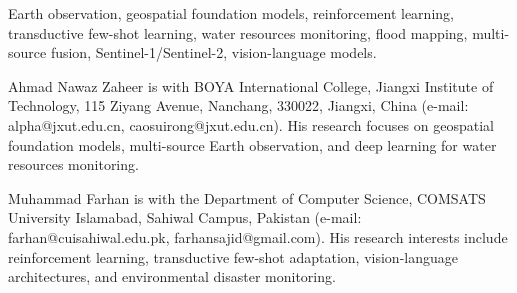 \documentclass[journal]{IEEEtran}
\begin{document}
\begin{IEEEkeywords}
Earth observation, geospatial foundation models, reinforcement learning, transductive few-shot learning, water resources monitoring, flood mapping, multi-source fusion, Sentinel-1/Sentinel-2, vision-language models.
\end{IEEEkeywords}














\begin{IEEEbiographynophoto}{Ahmad Nawaz Zaheer}
is with BOYA International College, Jiangxi Institute of Technology, 115 Ziyang Avenue, Nanchang, 330022, Jiangxi, China (e-mail: alpha@jxut.edu.cn, caosuirong@jxut.edu.cn). His research focuses on geospatial foundation models, multi-source Earth observation, and deep learning for water resources monitoring.
\end{IEEEbiographynophoto}

\begin{IEEEbiographynophoto}{Muhammad Farhan}
is with the Department of Computer Science, COMSATS University Islamabad, Sahiwal Campus, Pakistan (e-mail: farhan@cuisahiwal.edu.pk, farhansajid@gmail.com). His research interests include reinforcement learning, transductive few-shot adaptation, vision-language architectures, and environmental disaster monitoring.
\end{IEEEbiographynophoto}
\end{document}
